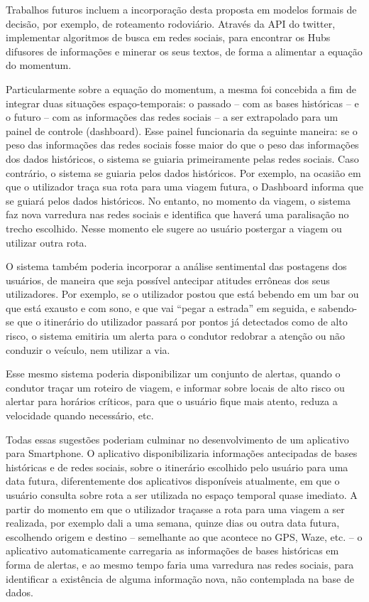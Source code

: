 Trabalhos futuros incluem a incorporação desta proposta em modelos formais de decisão, por exemplo, de roteamento
rodoviário. Através da API do twitter, implementar algoritmos de busca em redes sociais, para encontrar os Hubs difusores de informações e minerar os seus textos, de forma a alimentar a equação do momentum.

Particularmente sobre a equação do momentum, a mesma foi concebida a fim de integrar duas situações espaço-temporais: o passado -- com as bases históricas -- e o futuro -- com as informações das redes sociais -- a ser extrapolado para um painel de controle (dashboard). Esse painel funcionaria da seguinte maneira: se o peso das informações das redes sociais fosse maior do que o peso das informações dos dados históricos, o sistema se guiaria primeiramente pelas redes sociais. Caso contrário, o sistema se guiaria pelos dados históricos. Por exemplo, na ocasião em que o utilizador traça sua rota para uma viagem futura, o Dashboard informa que se guiará pelos dados históricos. No entanto, no momento da viagem, o sistema faz nova varredura nas redes sociais e identifica que haverá uma paralisação no trecho escolhido. Nesse momento ele sugere ao usuário postergar a viagem ou utilizar outra rota. 

O sistema também poderia incorporar a análise sentimental das postagens dos usuários, de maneira que seja possível antecipar atitudes errôneas dos seus utilizadores. Por exemplo, se o utilizador postou que está bebendo em um bar ou que está exausto e com sono, e que vai ``pegar a estrada'' em seguida, e sabendo-se que o itinerário do utilizador passará por pontos já detectados como de alto risco, o sistema emitiria um alerta para o condutor redobrar a atenção ou não conduzir o veículo, nem utilizar a via.

Esse mesmo sistema poderia disponibilizar um conjunto de alertas, quando o condutor traçar um roteiro de viagem, e informar sobre locais de alto risco ou alertar para horários críticos, para que o usuário fique mais atento, reduza a velocidade quando necessário, etc. 

Todas essas sugestões poderiam culminar no desenvolvimento de um aplicativo para Smartphone. O aplicativo disponibilizaria informações antecipadas de bases históricas e de redes sociais, sobre o itinerário escolhido pelo usuário para uma data futura, diferentemente dos aplicativos disponíveis atualmente, em que o usuário consulta sobre rota a ser utilizada no espaço temporal quase imediato. A partir do momento em que o utilizador traçasse a rota para uma viagem a ser realizada, por exemplo dali a uma semana, quinze dias ou outra data futura, escolhendo origem e destino -- semelhante ao que acontece no GPS, Waze, etc. -- o aplicativo automaticamente carregaria as informações de bases históricas em forma de alertas, e ao mesmo tempo faria uma varredura nas redes sociais, para identificar a existência de alguma informação nova, não contemplada na base de dados. 

